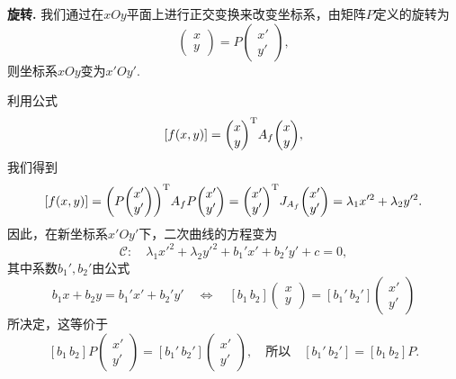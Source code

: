 {\bfseries 旋转.} 我们通过在$xOy$平面上进行正交变换来改变坐标系，由矩阵$P$定义的旋转为
\[
  \begin{pmatrix}
    x \\
    y
  \end{pmatrix} = P
  \begin{pmatrix}
    x' \\
    y'
  \end{pmatrix},
\]
则坐标系$xOy$变为$x'Oy'$.

利用公式
\[
  [f(x,y)] = \begin{pmatrix}
    x \\
    y
  \end{pmatrix}\TT A_f \begin{pmatrix}
    x \\
    y
  \end{pmatrix},
\]
我们得到
\[
  [f(x,y)] = \left( P\begin{pmatrix}
    x' \\
    y'
  \end{pmatrix} \right)\TT A_f P
  \begin{pmatrix}
    x' \\
    y'
  \end{pmatrix} =
  \begin{pmatrix}
    x' \\
    y'
  \end{pmatrix}\TT J_{A_f}
  \begin{pmatrix}
    x' \\
    y'
  \end{pmatrix} =
  \lambda_1x'^2 + \lambda_2y'^2.
\]
因此，在新坐标系$x'Oy'$下，二次曲线的方程变为
\begin{equation}\label{eq6.2}
  \mathscr C:\quad \lambda_1 x'^2 + \lambda_2y'^2 + b_1'x' + b_2'y' + c = 0,
\end{equation}
其中系数$b_1',b_2'$由公式
\[
  b_1x + b_2y = b_1'x' + b_2'y'\quad \Leftrightarrow
  \quad [b_1\,b_2]\begin{pmatrix}
    x \\
    y
  \end{pmatrix} = [b_1'\,b_2']
  \begin{pmatrix}
    x' \\
    y'
  \end{pmatrix}
\]
所决定，这等价于
\[
  [b_1\,b_2] P \begin{pmatrix}
    x' \\
    y'
  \end{pmatrix} =
  [b_1'\,b_2'] \begin{pmatrix}
    x' \\
    y'
  \end{pmatrix}, \quad \text{所以} \quad
  [b_1'\,b_2'] = [b_1\,b_2]P.
\]

